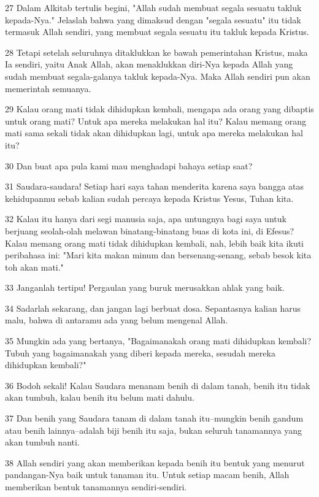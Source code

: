 \par 27 Dalam Alkitab tertulis begini, "Allah sudah membuat segala sesuatu takluk kepada-Nya." Jelaslah bahwa yang dimaksud dengan "segala sesuatu" itu tidak termasuk Allah sendiri, yang membuat segala sesuatu itu takluk kepada Kristus.
\par 28 Tetapi setelah seluruhnya ditaklukkan ke bawah pemerintahan Kristus, maka Ia sendiri, yaitu Anak Allah, akan menaklukkan diri-Nya kepada Allah yang sudah membuat segala-galanya takluk kepada-Nya. Maka Allah sendiri pun akan memerintah semuanya.
\par 29 Kalau orang mati tidak dihidupkan kembali, mengapa ada orang yang dibaptis untuk orang mati? Untuk apa mereka melakukan hal itu? Kalau memang orang mati sama sekali tidak akan dihidupkan lagi, untuk apa mereka melakukan hal itu?
\par 30 Dan buat apa pula kami mau menghadapi bahaya setiap saat?
\par 31 Saudara-saudara! Setiap hari saya tahan menderita karena saya bangga atas kehidupanmu sebab kalian sudah percaya kepada Kristus Yesus, Tuhan kita.
\par 32 Kalau itu hanya dari segi manusia saja, apa untungnya bagi saya untuk berjuang seolah-olah melawan binatang-binatang buas di kota ini, di Efesus? Kalau memang orang mati tidak dihidupkan kembali, nah, lebih baik kita ikuti peribahasa ini: "Mari kita makan minum dan bersenang-senang, sebab besok kita toh akan mati."
\par 33 Janganlah tertipu! Pergaulan yang buruk merusakkan ahlak yang baik.
\par 34 Sadarlah sekarang, dan jangan lagi berbuat dosa. Sepantasnya kalian harus malu, bahwa di antaramu ada yang belum mengenal Allah.
\par 35 Mungkin ada yang bertanya, "Bagaimanakah orang mati dihidupkan kembali? Tubuh yang bagaimanakah yang diberi kepada mereka, sesudah mereka dihidupkan kembali?"
\par 36 Bodoh sekali! Kalau Saudara menanam benih di dalam tanah, benih itu tidak akan tumbuh, kalau benih itu belum mati dahulu.
\par 37 Dan benih yang Saudara tanam di dalam tanah itu--mungkin benih gandum atau benih lainnya--adalah biji benih itu saja, bukan seluruh tanamannya yang akan tumbuh nanti.
\par 38 Allah sendiri yang akan memberikan kepada benih itu bentuk yang menurut pandangan-Nya baik untuk tanaman itu. Untuk setiap macam benih, Allah memberikan bentuk tanamannya sendiri-sendiri.
